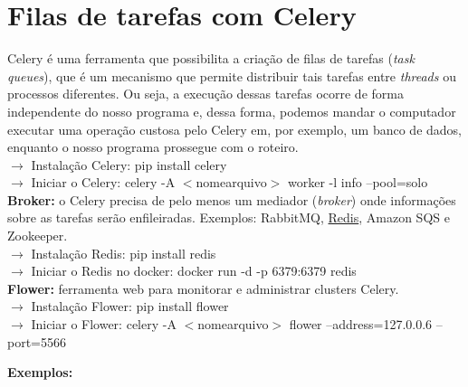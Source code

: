 \documentclass{beamer}
\begin{document}
	\section{Filas de tarefas com Celery}
	Celery é uma ferramenta que possibilita a criação de filas de tarefas (\textit{task queues}), que é um mecanismo que permite distribuir tais tarefas entre \textit{threads} ou processos diferentes. Ou seja, a execução dessas tarefas ocorre de forma independente do nosso programa e, dessa forma, podemos mandar o computador executar uma operação custosa pelo Celery em, por exemplo, um banco de dados, enquanto o nosso programa prossegue com o roteiro. \\
	$\rightarrow$ Instalação Celery: pip install celery \\
	$\rightarrow$ Iniciar o Celery: celery -A $<$nome\textunderscore arquivo$>$ worker -l info --pool=solo	
	\textbf{Broker:} o Celery precisa de pelo menos um mediador (\textit{broker}) onde informações sobre as tarefas serão enfileiradas. Exemplos: RabbitMQ, \underline{Redis}, Amazon SQS e Zookeeper. \\
	$\rightarrow$ Instalação Redis: pip install redis \\
	$\rightarrow$ Iniciar o Redis no docker: docker run -d -p 6379:6379 redis \\
	\textbf{Flower:} ferramenta web para monitorar e administrar clusters Celery. \\
	$\rightarrow$ Instalação Flower: pip install flower \\
	$\rightarrow$ Iniciar o Flower: celery -A $<$nome\textunderscore arquivo$>$ flower --address=127.0.0.6 --port=5566
	\newpage

	\alert{\textbf{Exemplos:}} \\
\end{document}
